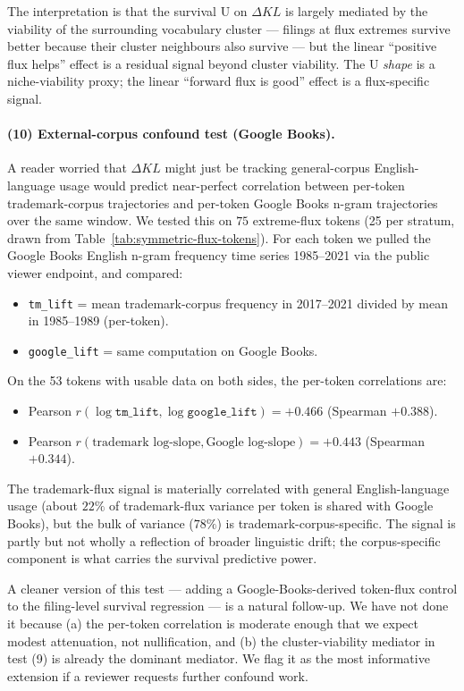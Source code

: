 \documentclass[11pt]{article}
\begin{document}
The interpretation is that the survival U on $\Delta KL$ is largely
mediated by the viability of the surrounding vocabulary cluster ---
filings at flux extremes survive better because their cluster
neighbours also survive --- but the linear ``positive flux helps''
effect is a residual signal beyond cluster viability. The U
\emph{shape} is a niche-viability proxy; the linear ``forward flux is
good'' effect is a flux-specific signal.

\paragraph{(10) External-corpus confound test (Google Books).}
A reader worried that $\Delta KL$ might just be tracking
general-corpus English-language usage would predict near-perfect
correlation between per-token trademark-corpus trajectories and
per-token Google Books n-gram trajectories over the same window. We
tested this on $75$ extreme-flux tokens (25 per stratum, drawn from
Table~\ref{tab:symmetric-flux-tokens}). For each token we pulled the
Google Books English n-gram frequency time series 1985--2021 via the
public viewer endpoint, and compared:
\begin{itemize}
  \item \texttt{tm\_lift} = mean trademark-corpus frequency in
        2017--2021 divided by mean in 1985--1989 (per-token).
  \item \texttt{google\_lift} = same computation on Google Books.
\end{itemize}
On the 53 tokens with usable data on both sides, the per-token
correlations are:
\begin{itemize}
  \item Pearson $r(\log \texttt{tm\_lift}, \log \texttt{google\_lift})
        = +0.466$ (Spearman $+0.388$).
  \item Pearson $r(\text{trademark log-slope}, \text{Google log-slope})
        = +0.443$ (Spearman $+0.344$).
\end{itemize}
The trademark-flux signal is materially correlated with general
English-language usage (about $22\%$ of trademark-flux variance per
token is shared with Google Books), but the bulk of variance ($78\%$)
is trademark-corpus-specific. The signal is partly but not wholly a
reflection of broader linguistic drift; the corpus-specific component
is what carries the survival predictive power.

A cleaner version of this test --- adding a Google-Books-derived
token-flux control to the filing-level survival regression --- is a
natural follow-up. We have not done it because (a) the per-token
correlation is moderate enough that we expect modest attenuation,
not nullification, and (b) the cluster-viability mediator in test
(9) is already the dominant mediator. We flag it as the most
informative extension if a reviewer requests further confound work.
\end{document}
